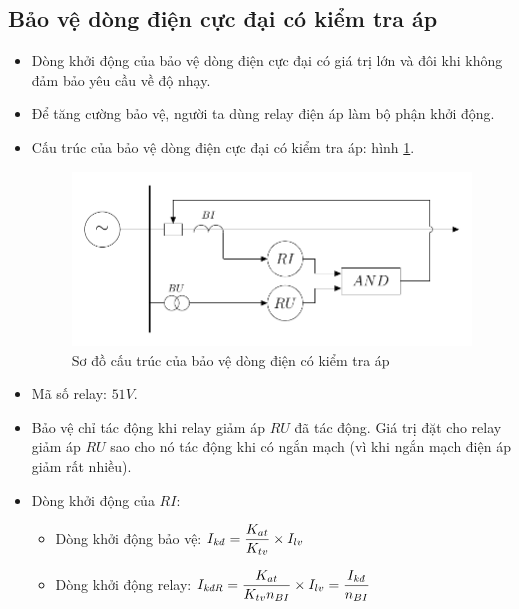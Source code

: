 \documentclass[12pt,a4paper]{article}
\begin{document}
\subsection{Bảo vệ dòng điện cực đại có kiểm tra áp}
	\begin{itemize}
		\item Dòng khởi động của bảo vệ dòng điện cực đại có giá trị lớn và đôi khi không đảm bảo yêu cầu về độ nhạy.
		
		\item Để tăng cường bảo vệ, người ta dùng relay điện áp làm bộ phận khởi động.
		
		\item Cấu trúc của bảo vệ dòng điện cực đại có kiểm tra áp: hình \ref{Fig:sodocautruc-bvdongdien-kiemtraap}.
			\begin{figure}[!h]
				\begin{center}					
					\includegraphics[scale=1]{diagram-draw-tikz/Figure-cautruc-baove-dongdiencokiemtraap.pdf} 
				\end{center}
				\caption{Sơ đồ cấu trúc của bảo vệ dòng điện có kiểm tra áp} \label{Fig:sodocautruc-bvdongdien-kiemtraap}
			\end{figure}

			\item Mã số relay: $51V$.
		
		\item Bảo vệ chỉ tác động khi relay giảm áp $RU$ đã tác động. Giá trị đặt cho relay giảm áp $RU$ sao cho nó tác động khi có ngắn mạch (vì khi ngắn mạch điện áp giảm rất nhiều).
		
		\item Dòng khởi động của $RI$:
			\begin{itemize}
				\item Dòng khởi động bảo vệ: $I_{\text{\textit{kđ}}} = \dfrac{K_{at}}{K_{tv}} \times I_{lv}$
				
				\item Dòng khởi động relay: $I_{\text{\textit{kđR}}} = \dfrac{K_{at}}{K_{tv}n_{BI}} \times I_{lv} = \dfrac{I_{\text{\textit{kđ}}}}{n_{BI}}$
				

\end{itemize}
\end{itemize}
\end{document}
